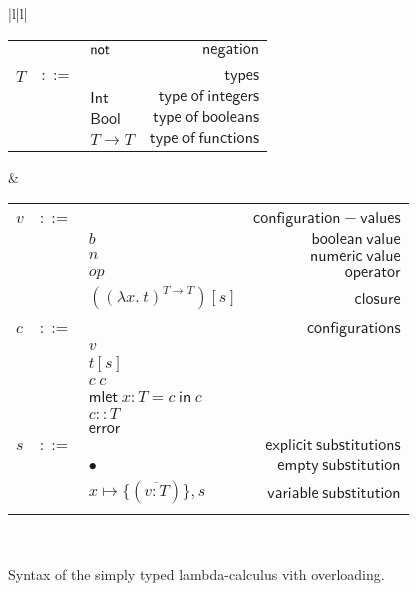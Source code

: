 \documentclass[preprint,authoryear,sort&compress,9pt,nocopyrightspace]{article}
\newcommand{\conf}[2][s]{(#2)[#1]}
\newcommand{\subxD}{x \mapsto \{(\overline{v:T})\},s}
\newcommand{\ascrip}[1]{#1::T}
\newcommand{\oletP}[3]{\mathsf{mlet} \ x : #1 = #2 \ \mathsf{in}  \ #3}
\newcommand{\absST}[2]{(\lambda #1. \ #2)^{T \to T}}
\newcommand{\negacion}[1]{\mathsf{not} \ #1}
\newcommand{\suma}[1]{\mathsf{add1} \ #1}
\newcommand{\boolt}{\mathsf{Bool}}
\newcommand{\intt}{\mathsf{Int}}
\begin{document}
\begin{figure}
\begin{small}
\begin{center}
\begin{tabular}{|l|l|}
\begin{tabular}{l c l r}
&&$\negacion$&$\mathsf{negation} $\\
&&&\\
$T$&$::=$&&$\mathsf {types}$\\
&&$\intt$&$\mathsf {type \ of \ integers}$\\
&&$\boolt$&$\mathsf {type \ of \ booleans}$\\
&&$T \to T$&$\mathsf {type \ of \ functions}$\\
\end{tabular}
& \begin{tabular}{l c l r}
&&&\\
$v$&$::=$&&$\mathsf {configuration-values}$\\
&&$b$&$\mathsf {boolean \ value}$\\
&&$n$&$\mathsf{numeric \ value} $\\
&&$op$&$\mathsf{operator}$\\
&&$\conf{\absST {x}{t}}$&$\mathsf{closure}$\\
&&&\\
$c$&$::=$&&$\mathsf {configurations}$\\
&&$v$&\\
&&$t[s]$&\\
&&$c \ c $&\\
&&$\oletP {T}{c}{c}$&\\
&&$\ascrip{c}$&\\
&&$\mathsf{error}$&\\
$s$&$::=$&&$\mathsf {explicit \ substitutions}$\\
&&$ \bullet$&$\mathsf {empty \ substitution}$\\
&&$\subxD$&$\mathsf {variable \ substitution}$\\
&&&\\
\end{tabular}\\
\hline
\end{tabular}
\hspace*{-2cm}
\caption{Syntax of the simply typed lambda-calculus vith overloading.}
\label{figure:sencilla}
\end{center}
\end{small}
\end{figure}
\end{document}
